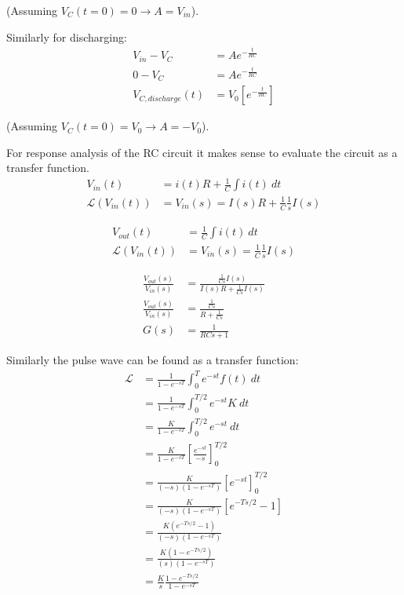 \documentclass[11pt]{article}
\begin{document}
(Assuming $V_C(t=0)=0 \to A=V_{in}$).

Similarly for discharging:
\begin{subequations}
  \begin{align}
    V_{in} - V_C &= Ae^{-\frac{t}{RC}} \\
    0 - V_C &= Ae^{-\frac{t}{RC}} \\
    V_{C,discharge}(t) &= V_0\left[e^{-\frac{t}{RC}}\right]
  \end{align}
\end{subequations}

(Assuming $V_C(t=0)=V_0 \to A=-V_0$).

For response analysis of the RC circuit it makes sense to evaluate the circuit as a transfer function.
\begin{subequations}
  \begin{align}
    V_{in}(t) &= i(t) R + \frac{1}{C} \int i(t)~dt \\
    \mathcal{L}(V_{in}(t)) &= V_{in}(s) = I(s) R + \frac{1}{C}\frac{1}{s} I(s)
  \end{align}
\end{subequations}

\begin{subequations}
  \begin{align}
    V_{out}(t) &= \frac{1}{C} \int i(t)~dt \\
    \mathcal{L}(V_{in}(t)) &= V_{in}(s) = \frac{1}{C}\frac{1}{s} I(s)
  \end{align}
\end{subequations}

\begin{subequations}
  \begin{align}
  \frac{V_{out}(s)}{V_{in}(s)} &= \frac{\frac{1}{Cs} I(s)}{I(s)R + \frac{1}{Cs} I(s)} \\
  \frac{V_{out}(s)}{V_{in}(s)} &= \frac{\frac{1}{Cs}}{R+\frac{1}{Cs}} \\
  G(s) &= \frac{1}{RCs + 1}
  \end{align}
\end{subequations}

Similarly the pulse wave can be found as a transfer function:
\begin{subequations}
  \begin{align}
    \mathcal{L} &= \frac{1}{1-e^{-sT}} \int_0^T e^{-st} f(t)~dt \\
    &= \frac{1}{1-e^{-sT}} \int_0^{T/2} e^{-st} K~dt \\
    &= \frac{K}{1-e^{-sT}} \int_0^{T/2} e^{-st}~dt \\
    &= \frac{K}{1-e^{-sT}} \left[\frac{e^{-st}}{-s}\right]_0^{T/2} \\
    &= \frac{K}{(-s)(1-e^{-sT})} \left[e^{-st}\right]_0^{T/2} \\
    &= \frac{K}{(-s)(1-e^{-sT})} \left[e^{-Ts/2} - 1\right] \\
    &= \frac{K(e^{-Ts/2}-1)}{(-s)(1-e^{-sT})} \\
    &= \frac{K(1-e^{-Ts/2})}{(s)(1-e^{-sT})} \\
    &= \frac{K}{s}\frac{1-e^{-Ts/2}}{1-e^{-sT}}
  \end{align}
\end{subequations}
\end{document}
